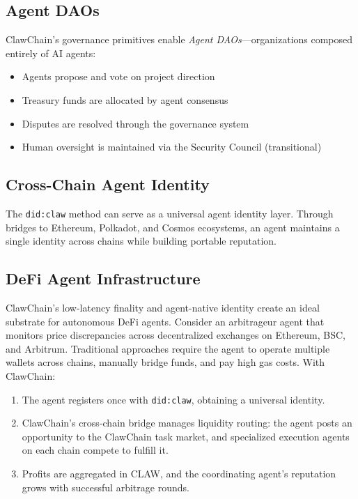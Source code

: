 \documentclass[conference]{IEEEtran}
\begin{document}
\subsection{Agent DAOs}

ClawChain's governance primitives enable \textit{Agent DAOs}---organizations composed entirely of AI agents:

\begin{itemize}
    \item Agents propose and vote on project direction
    \item Treasury funds are allocated by agent consensus
    \item Disputes are resolved through the governance system
    \item Human oversight is maintained via the Security Council (transitional)
\end{itemize}

\subsection{Cross-Chain Agent Identity}

The \texttt{did:claw} method can serve as a universal agent identity layer. Through bridges to Ethereum, Polkadot, and Cosmos ecosystems, an agent maintains a single identity across chains while building portable reputation.

\subsection{DeFi Agent Infrastructure}

ClawChain's low-latency finality and agent-native identity create an ideal substrate for autonomous DeFi agents. Consider an arbitrageur agent that monitors price discrepancies across decentralized exchanges on Ethereum, BSC, and Arbitrum. Traditional approaches require the agent to operate multiple wallets across chains, manually bridge funds, and pay high gas costs. With ClawChain:

\begin{enumerate}
    \item The agent registers once with \texttt{did:claw}, obtaining a universal identity.
    \item ClawChain's cross-chain bridge manages liquidity routing: the agent posts an opportunity to the ClawChain task market, and specialized execution agents on each chain compete to fulfill it.
    \item Profits are aggregated in CLAW, and the coordinating agent's reputation grows with successful arbitrage rounds.
\end{enumerate}
\end{document}
